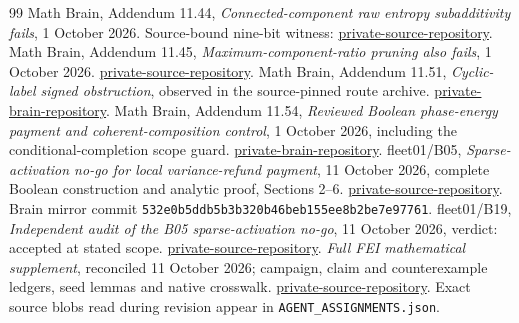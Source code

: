 \documentclass[11pt]{article}
\begin{document}
\begin{thebibliography}{99}
 Math Brain, Addendum 11.44, \emph{Connected-component raw entropy subadditivity fails}, 1 October 2026. Source-bound nine-bit witness: \url{private-source-repository}.
 Math Brain, Addendum 11.45, \emph{Maximum-component-ratio pruning also fails}, 1 October 2026. \url{private-source-repository}.
 Math Brain, Addendum 11.51, \emph{Cyclic-label signed obstruction}, observed in the source-pinned route archive. \url{private-brain-repository}.
 Math Brain, Addendum 11.54, \emph{Reviewed Boolean phase-energy payment and coherent-composition control}, 1 October 2026, including the conditional-completion scope guard. \url{private-brain-repository}.
 fleet01/B05, \emph{Sparse-activation no-go for local variance-refund payment}, 11 October 2026, complete Boolean construction and analytic proof, Sections 2--6. \url{private-source-repository}. Brain mirror commit \texttt{532e0b5ddb5b3b320b46beb155ee8b2be7e97761}.
 fleet01/B19, \emph{Independent audit of the B05 sparse-activation no-go}, 11 October 2026, verdict: accepted at stated scope. \url{private-source-repository}.
 \emph{Full FEI mathematical supplement}, reconciled 11 October 2026; campaign, claim and counterexample ledgers, seed lemmas and native crosswalk. \url{private-source-repository}. Exact source blobs read during revision appear in \texttt{AGENT\_ASSIGNMENTS.json}.
\end{thebibliography}
\end{document}
